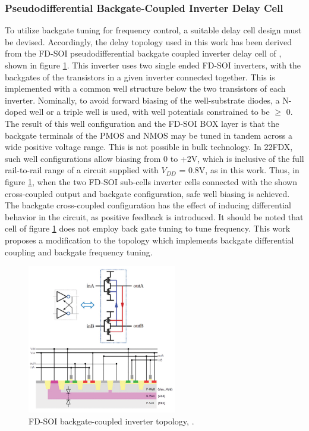 		\subsubsection{Pseudodifferential Backgate-Coupled Inverter Delay Cell}\label{sec:pd_inv}
		To utilize backgate tuning for frequency control, a suitable delay cell design must be devised. Accordingly, the delay topology used in this work has been derived from the FD-SOI pseudodifferential backgate coupled inverter delay cell of \cite{Jacquemod2019}, shown in figure \ref{fig:bg_inv_jacqu}. This inverter uses two single ended FD-SOI inverters, with the backgates of the transistors in a given inverter connected together. This is implemented with a common well structure below the two transistors of each inverter. Nominally, to avoid forward biasing of the well-substrate diodes, a N-doped well or a triple well is used, with well potentials constrained to be $\geq$ 0. The result of this well configuration and the FD-SOI BOX layer is that the backgate terminals of the PMOS and NMOS may be tuned in tandem across a wide positive voltage range. This is not possible in bulk technology. In 22FDX, such well configurations allow biasing from 0 to +2V, which is inclusive of the full rail-to-rail range of a circuit supplied with $V_{DD}$ = 0.8V, as in this work. Thus, in figure \ref{fig:bg_inv_jacqu}, when the two FD-SOI sub-cells inverter cells connected with the shown cross-coupled output and backgate configuration, safe well biasing is achieved. The backgate cross-coupled configuration has the effect of inducing differential behavior in the circuit, as positive feedback is introduced. It should be noted that cell of figure \ref{fig:bg_inv_jacqu} does not employ back gate tuning to tune frequency. This work proposes a modification to the topology which implements backgate differential coupling and backgate frequency tuning.

		\begin{figure}[htb!]
		        \centering
		        \includegraphics[width=0.58\textwidth, angle=0]{./figs/design/jacqu2-1-large.png}
		    \caption{FD-SOI backgate-coupled inverter topology, .}
		    \label{fig:bg_inv_jacqu}
		\end{figure}	

